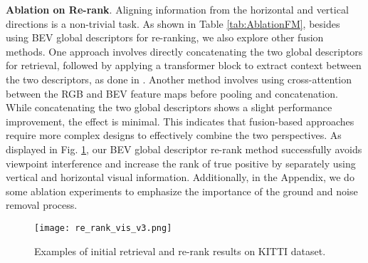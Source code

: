 \textbf{Ablation on Re-rank}. 
Aligning information from the horizontal and vertical directions is a non-trivial task. As shown in Table \ref{tab:AblationFM}, besides using BEV global descriptors for re-ranking, we also explore other fusion methods. One approach involves directly concatenating the two global descriptors for retrieval, followed by applying a transformer block to extract context between the two descriptors, as done in \cite{zhang2024mvse}. Another method involves using cross-attention between the RGB and BEV feature maps before pooling and concatenation. While concatenating the two global descriptors shows a slight performance improvement, the effect is minimal. This indicates that fusion-based approaches require more complex designs to effectively combine the two perspectives. As displayed in Fig. \ref{fig:RerankVis}, our BEV global descriptor re-rank method successfully avoids viewpoint interference and increase the rank of true positive by separately using vertical and horizontal visual information. Additionally, in the Appendix, we do some ablation experiments to emphasize the importance of the ground and noise removal process.

\begin{figure}[!t]
    \centering
    \texttt{[image: re\_rank\_vis\_v3.png]}
    \caption{Examples of initial retrieval and re-rank results on KITTI dataset.}
    \label{fig:RerankVis}
\end{figure}